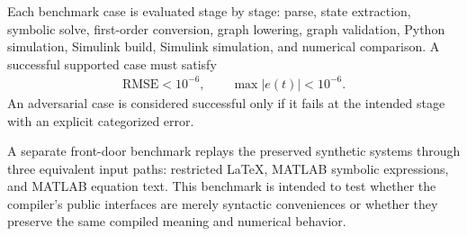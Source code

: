 \documentclass[colorlinks,upint,subscriptcorrection,varvw,balance,nofoot]{asmeconf}
\begin{document}
Each benchmark case is evaluated stage by stage: parse, state extraction, symbolic solve, first-order conversion, graph lowering, graph validation, Python simulation, Simulink build, Simulink simulation, and numerical comparison. A successful supported case must satisfy
\begin{align}
  \mathrm{RMSE} < 10^{-6}, \qquad \max |e(t)| < 10^{-6}.
\end{align}
An adversarial case is considered successful only if it fails at the intended stage with an explicit categorized error.

A separate front-door benchmark replays the preserved synthetic systems through three equivalent input paths: restricted \LaTeX{}, MATLAB symbolic expressions, and MATLAB equation text. This benchmark is intended to test whether the compiler's public interfaces are merely syntactic conveniences or whether they preserve the same compiled meaning and numerical behavior.
\end{document}
